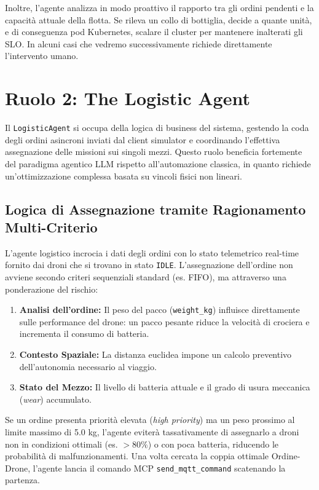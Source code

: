 Inoltre, l'agente analizza in modo proattivo il rapporto tra gli ordini pendenti e la capacità attuale della flotta. Se rileva un collo di bottiglia, decide a quante unità, e di conseguenza pod Kubernetes, scalare il cluster per mantenere inalterati gli SLO. In alcuni casi che vedremo successivamente richiede direttamente l'intervento umano.

\section{Ruolo 2: The Logistic Agent}
\label{sec:logistic_agent}
Il \texttt{LogisticAgent} si occupa della logica di business del sistema, gestendo la coda degli ordini asincroni inviati dal client simulator e coordinando l'effettiva assegnazione delle missioni sui singoli mezzi. Questo ruolo beneficia fortemente del paradigma agentico LLM rispetto all'automazione classica, in quanto richiede un'ottimizzazione complessa basata su vincoli fisici non lineari.

\subsection*{Logica di Assegnazione tramite Ragionamento Multi-Criterio}
L'agente logistico incrocia i dati degli ordini con lo stato telemetrico real-time fornito dai droni che si trovano in stato \texttt{IDLE}. L'assegnazione dell'ordine non avviene secondo criteri sequenziali standard (es. FIFO), ma attraverso una ponderazione del rischio:
\begin{enumerate}
    \item \textbf{Analisi dell'ordine:} Il peso del pacco (\texttt{weight\_kg}) influisce direttamente sulle performance del drone: un pacco pesante riduce la velocità di crociera e incrementa il consumo di batteria.
    \item \textbf{Contesto Spaziale:} La distanza euclidea impone un calcolo preventivo dell'autonomia necessario al viaggio.
    \item \textbf{Stato del Mezzo:} Il livello di batteria attuale e il grado di usura meccanica (\textit{wear}) accumulato.
\end{enumerate}

Se un ordine presenta priorità elevata (\textit{high priority}) ma un peso prossimo al limite massimo di 5.0 kg, l'agente eviterà tassativamente di assegnarlo a droni non in condizioni ottimali (es. $>80\%$) o con poca batteria, riducendo le probabilità di malfunzionamenti. Una volta cercata la coppia ottimale Ordine-Drone, l'agente lancia il comando MCP \texttt{send\_mqtt\_command} scatenando la partenza.

